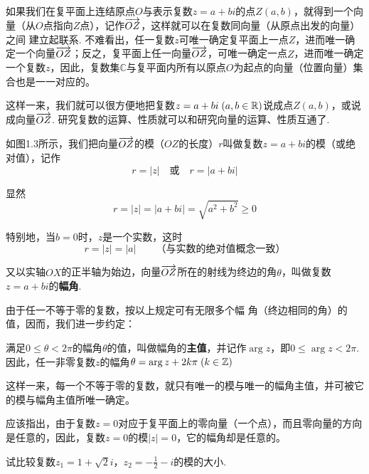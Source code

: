 如果我们在复平面上连结原点$O$与表示复数$z=a+bi$的点$Z(a,b)$，就得到一个向量（从$O$点指向$Z$点），记作$\overrightarrow{OZ}$，这样就可以在复数同向量（从原点出发的向量）之间
建立起联系. 不难看出，任一复数$z$可唯一确定复平面上一点$Z$，进而唯一确定一个向量$\overrightarrow{OZ}$；反之，复平面上任一向量$\overrightarrow{OZ}$，可唯一确定一点$Z$，进而唯一确定一个复数$z$，因此，复数集$\mathbb{C}$与复平面内所有以原点$O$为起点的向量（位置向量）集合也是一一对应的。

这样一来，我们就可以很方便地把复数$z=a+bi\; (a,b\in\mathbb{R})$说成点$Z(a,b)$，或说成向量$\overrightarrow{OZ}$. 研究复数的运算、性质就可以和研究向量的运算、性质互通了.

如图1.3所示，我们把向量$\overrightarrow{OZ}$的模（$OZ$的长度）$r$叫做复数$z=a+bi$的模（或绝对值），记作
\[r=|z|\quad \text{或}\quad r=|a+bi|\]
\begin{figure}[htp]
    \centering
{}
    \caption{}
\end{figure}

显然
\[r=|z|=|a+bi|=\sqrt{a^2+b^2}\ge 0\]

特别地，当$b=0$时，$z$是一个实数，这时
\[r=|z|=|a|\qquad  \text{（与实数的绝对值概念一致）
}\]

又以实轴$OX$的正半轴为始边，向量$\overrightarrow{OZ}$所在的射线为终边的角$\theta$，叫做复数$z=a+bi$的\textbf{幅角}.

由于任一不等于零的复数，按以上规定可有无限多个幅
角（终边相同的角）的值，因而，我们进一步约定：

满足$0\le\theta<2\pi$的幅角$\theta$的值，叫做幅角的\textbf{主值}，并记作$\arg z$，即$0\le \arg z<2\pi$. 
因此，任一非零复数$z$的幅角$\theta=\arg z+2k\pi\; (k\in\mathbb{Z})$

这样一来，每一个不等于零的复数，就只有唯一的模与唯一的幅角主值，并可被它的模与幅角主值所唯一确定。

应该指出，由于复数$z=0$对应于复平面上的零向量（一个点），而且零向量的方向是任意的，因此，复数$z=0$的模$|z|=0$，它的幅角却是任意的。

\begin{example}
试比较复数$z_1=1+\sqrt{2}i$，$z_2=-\frac{1}{2}-i$的模的大小.
\end{example}

